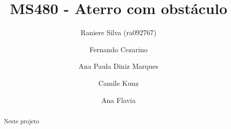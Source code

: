 \documentclass[12pt,a4paper]{article}
\begin{document}
\title{MS480 - Aterro com obst\'{a}culo}
\author{Raniere Silva (ra092767) \and Fernando Cezarino \and Ana Paula Diniz
Marques \and Camile Kunz \and Ana Flavia}
\maketitle
\begin{abstract}
    Neste projeto
\end{abstract}
\tableofcontents
\newpage





\appendix



\end{document}
